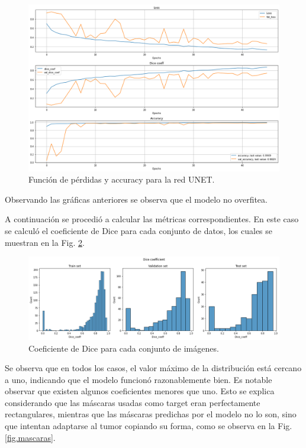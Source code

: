 \begin{figure}[H]
\centering
        \includegraphics[width=0.8\linewidth]{chapters/segmentacion/images/metricas.png}
        \caption{Función de pérdidas y accuracy para la red UNET.}
        \label{fig.loss}
  \end{figure}

Observando las gráficas anteriores se observa que el modelo no overfitea. 

A continuación se procedió a calcular las métricas correspondientes. En este caso se calculó el coeficiente de Dice para cada conjunto de datos, los cuales se muestran en la Fig. \ref{fig.dice}.


\begin{figure}[H]
\centering
        \includegraphics[width=0.9\linewidth]{chapters/segmentacion/images/dice.png}
        \caption{Coeficiente de Dice para cada conjunto de imágenes.}
        \label{fig.dice}
  \end{figure}

Se observa que en todos los casos, el valor máximo de la distribución está cercano a uno, indicando que el modelo funcionó razonablemente bien. Es notable observar que existen algunos coeficientes menores que uno. Esto se explica considerando que las máscaras usadas como target eran perfectamente rectangulares, mientras que las máscaras predichas por el modelo no lo son, sino que intentan adaptarse al tumor copiando su forma, como se observa en la Fig. \ref{fig.mascaras}. 

